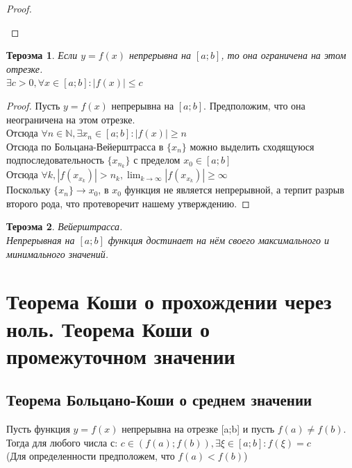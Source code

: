 \documentclass[oneside]{book}
\newtheorem{thm}{Тероэма}[chapter] %
\begin{document}
\begin{enumerate}
\begin{proof}
\begin{center}
    \end{center}
\end{proof}
\begin{thm}
Если $y = f(x)$ непрерывна на $[a; b]$, то она ограничена на этом отрезке. \\
$ \exists c > 0, \forall x \in [a;b]: |f(x)| \leq c $
\end{thm}
\begin{proof}
    Пусть $y = f(x)$ непрерывна на $[a; b]$. Предположим, что она неограничена на этом отрезке. \\
    Отсюда $\forall n \in \mathbb{N}, \exists x_n \in [a;b]: |f(x)| \geq n$\\
    Отсюда по Больцана-Вейерштрасса в $\{x_n\}$ можно выделить сходящуюся подпоследовательность $\{x_{n_k}\}$ с пределом $x_0 \in [a; b]$\\
    Отсюда $\forall k, |f(x_{x_k})| > n_k, \lim_{k \rightarrow \infty}{|f(x_{x_k})|} \geq \infty$ \\
    Поскольку $\{x_n\} \rightarrow x_0$, в $x_0$ функция не является непрерывной, а терпит разрыв второго рода, что протеворечит нашему утверждению.
\end{proof}

\begin{thm}
    Вейерштрасса. \\
    Непрерывная на $[a; b]$ функция достинает на нём своего максимального и минимального значений.
\end{thm}

\chapter {Теорема Коши о прохождении через ноль. Теорема Коши о промежуточном значении}
\section{Теорема Больцано-Коши о среднем значении}
Пусть функция $y = f(x)$ непрерывна на отрезке [a;b] и пусть $f(a)\neq f(b)$. Тогда для любого числа с: $c \in (f(a); f(b)), \exists \xi \in [a; b]: f(\xi)=c$
\\(Для определенности предположем, что $f(a)<f(b)$)

\end{enumerate}
\end{document}
